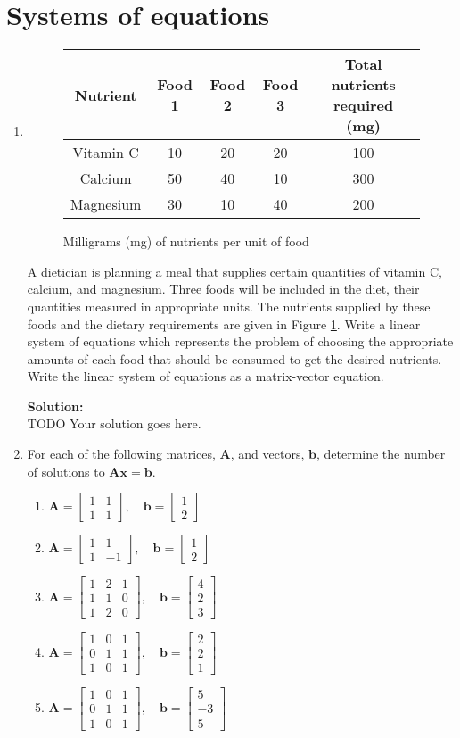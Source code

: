 \documentclass[]{article}
\newcommand{\bbm}{\begin{bmatrix}}		%
\newcommand{\ebm}{\end{bmatrix}}		%
\newcommand{\x}{\bm{x}}					%
\newcommand{\A}{\bm{A}}					%
\newcommand{\solution}{\vskip 0.5cm \textbf{\large Solution:} \\}
\begin{document}
    \section*{Systems of equations}
    \begin{enumerate}[resume]
	\item \begin{figure}
	  \centering
	  \begin{tabular}{ccccc}
		Nutrient & Food 1 & Food 2 & Food 3 & Total nutrients required (mg) \\ \hline
		Vitamin C & 10 & 20 & 20 & 100 \\
		Calcium & 50 & 40 & 10 & 300 \\
		Magnesium & 30 & 10 & 40 & 200 \\ \hline
	  \end{tabular}
	  \caption{Milligrams (mg) of nutrients per unit of food}
	  \label{fig:diet}
	\end{figure}

	  A dietician is planning a meal that supplies certain quantities of vitamin C, calcium, and magnesium. Three foods will be included in the diet, their quantities measured in appropriate units. The nutrients supplied by these foods and the dietary requirements are given in Figure \ref{fig:diet}. Write a linear system of equations which represents the problem of choosing the appropriate amounts of each food that should be consumed to get the desired nutrients. Write the linear system of equations as a matrix-vector equation.

	  \solution
	  TODO Your solution goes here.


	\item For each of the following matrices, $\A$, and vectors, $\bm{b}$, determine the number of solutions to $\A\x=\bm{b}$.
	  \begin{enumerate}
	  \item $\A = \bbm 1&1\\1&1 \ebm,\quad \bm{b}=\bbm 1\\2\ebm$
	  \item $\A = \bbm 1&1\\1&-1\ebm,\quad \bm{b}=\bbm 1\\2\ebm$
	  \item $\A = \bbm 1 & 2 & 1 \\ 1&1&0\\1&2&0 \ebm,\quad \bm{b}=\bbm 4\\2\\3 \ebm$
	  \item $\A = \bbm 1&0&1\\0&1&1\\1&0&1 \ebm,\quad \bm{b}=\bbm 2\\2\\1 \ebm$
	  \item $\A = \bbm 1&0&1\\0&1&1\\1&0&1 \ebm,\quad \bm{b}=\bbm 5\\-3\\5 \ebm$
	  \end{enumerate}


\end{enumerate}
\end{document}
